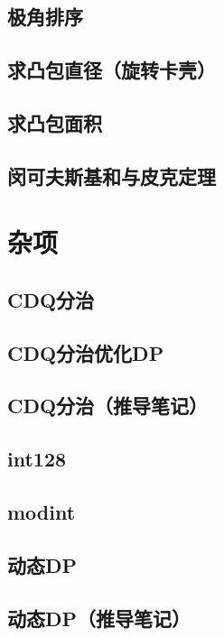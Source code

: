 \documentclass[11pt,a4paper]{ctexart}
\begin{document}
\subsection{极角排序}


\subsection{求凸包直径（旋转卡壳）}


\subsection{求凸包面积}


\subsection{闵可夫斯基和与皮克定理}


\section{杂项}
\subsection{CDQ分治}


\subsection{CDQ分治优化DP}


\subsection{CDQ分治（推导笔记）}


\subsection{int128}


\subsection{modint}


\subsection{动态DP}


\subsection{动态DP（推导笔记）}

\end{document}
